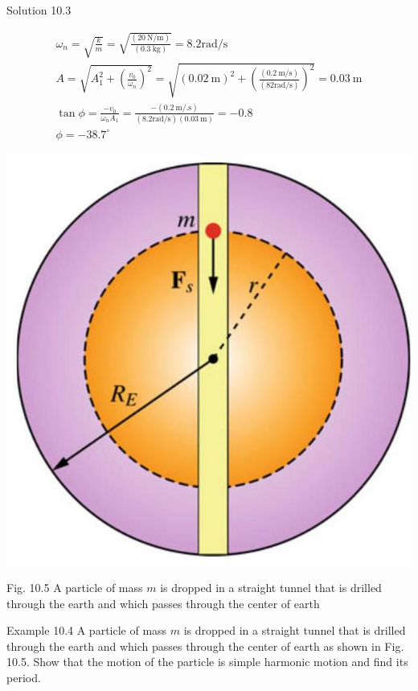 \documentclass[10pt]{article}
\begin{document}
Solution 10.3

$$
\begin{gathered}
\omega_{n}=\sqrt{\frac{k}{m}}=\sqrt{\frac{(20 \mathrm{~N} / \mathrm{m})}{(0.3 \mathrm{~kg})}}=8.2 \mathrm{rad} / \mathrm{s} \\
A=\sqrt{A_{1}^{2}+\left(\frac{v_{0}}{\omega_{n}}\right)^{2}}=\sqrt{(0.02 \mathrm{~m})^{2}+\left(\frac{(0.2 \mathrm{~m} / \mathrm{s})}{(82 \mathrm{rad} / \mathrm{s})}\right)^{2}}=0.03 \mathrm{~m} \\
\tan \phi=\frac{-v_{0}}{\omega_{n} A_{1}}=\frac{-(0.2 \mathrm{~m} / . \mathrm{s})}{(8.2 \mathrm{rad} / \mathrm{s})(0.03 \mathrm{~m})}=-0.8 \\
\phi=-38.7^{\circ}
\end{gathered}
$$

\begin{center}
\includegraphics[max width=\textwidth]{2024_09_13_db1f357d2aad0a03eb2eg-165}
\end{center}

Fig. 10.5 A particle of mass $m$ is dropped in a straight tunnel that is drilled through the earth and which passes through the center of earth

Example 10.4 A particle of mass $m$ is dropped in a straight tunnel that is drilled through the earth and which passes through the center of earth as shown in Fig. 10.5. Show that the motion of the particle is simple harmonic motion and find its period.
\end{document}

